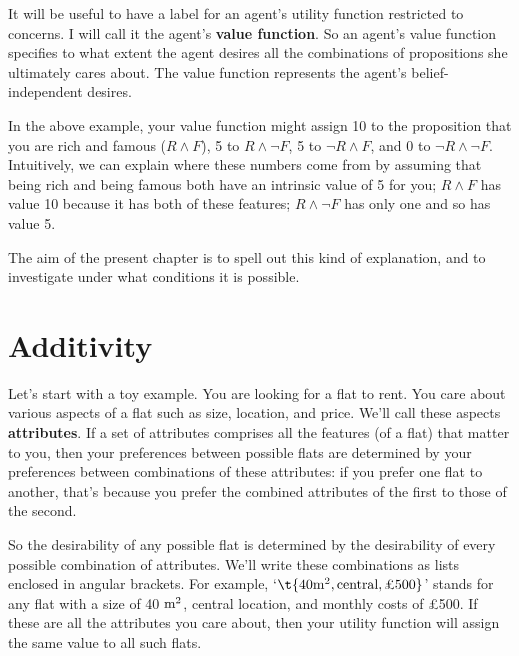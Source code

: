 It will be useful to have a label for an agent's utility function restricted to
concerns. I will call it the agent's \textbf{value function}. So an agent's
value function specifies to what extent the agent desires all the combinations
of propositions she ultimately cares about. The value function represents the
agent's belief-independent desires.

In the above example, your value function might assign 10 to the proposition
that you are rich and famous ($R \land F$), 5 to $R \land \neg F$, 5 to
$\neg R \land F$, and 0 to $\neg R \land \neg F$. Intuitively, we can explain
where these numbers come from by assuming that being rich and being famous both
have an intrinsic value of 5 for you; $R \land F$ has value 10 because it has
both of these features; $R \land \neg F$ has only one and so has value 5.

The aim of the present chapter is to spell out this kind of explanation, and
to investigate under what conditions it is possible.

\section{Additivity}\label{sec:additivity}

Let's start with a toy example. You are looking for a flat to rent.
You care about various aspects of a flat such as size, location, and
price. We'll call these aspects \textbf{attributes}. If a set of
attributes comprises all the features (of a flat) that matter to you,
then your preferences between possible flats are determined by your
preferences between combinations of these attributes: if you prefer
one flat to another, that's because you prefer the combined attributes
of the first to those of the second.

So the desirability of any possible flat is determined by the
desirability of every possible combination of attributes. We'll write
these combinations as lists enclosed in angular brackets. For example,
`$\t{40 \m^2, \text{central}, \text{£500}}$' stands for any flat with
a size of 40 $\text{m}^2$, central location, and monthly costs of £500. If
these are all the attributes you care about, then your utility
function will assign the same value to all such flats.


